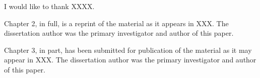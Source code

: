 \begin{acknowledgements}

I would like to thank XXXX.

Chapter 2, in full, is a reprint of the material as it appears in XXX. The dissertation author was the primary investigator and author of this paper.

Chapter 3, in part, has been submitted for publication of the material as it may appear in XXX. The dissertation author was the primary investigator and author of this paper.

\end{acknowledgements}
